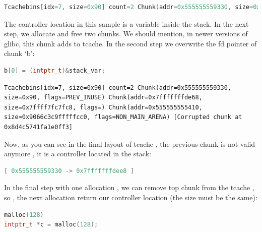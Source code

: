 \documentclass{masterthesis}
\newcommand*\libc{glibc}
\newcommand*\tch{tcache}
\begin{document}
\begin{lstlisting}[language=c,frame=tlrb]
Tcachebins[idx=7, size=0x90] count=2 Chunk(addr=0x555555559330, size=0x90, flags=PREV_INUSE) Chunk(addr=0x5555555592a0, size=0x90, flags=PREV_INUSE)
\end{lstlisting}

The controller location in this sample is a variable inside the stack. In the next step, we allocate and free two chunks. We should mention, in newer versions of \libc{}, this chunk adds to \tch{}.
In the second step we overwrite the fd pointer of chunk ‘b’:

\begin{lstlisting}[language=c,frame=tlrb]
b[0] = (intptr_t)&stack_var;
\end{lstlisting}

\begin{lstlisting}[frame=tlrb]
Tcachebins[idx=7, size=0x90] count=2 Chunk(addr=0x555555559330, size=0x90, flags=PREV_INUSE) Chunk(addr=0x7fffffffde68, size=0x7ffff7fc7fc8, flags=) Chunk(addr=0x555555555410, size=0x9066c3c9fffffcc0, flags=NON_MAIN_ARENA) [Corrupted chunk at 0x8d4c5741fa1e0ff3]
\end{lstlisting}

Now, as you can see in the final layout of \tch{} , the previous chunk is not valid anymore , it is a controller located in the stack:
\begin{lstlisting}[language=c,frame=tlrb]
[ 0x555555559330 -> 0x7fffffffdee8 ]
\end{lstlisting}
In the final step with one allocation , we can remove top chunk from the \tch{} , so , the next allocation return our controller location (the size must be the same):
\begin{lstlisting}[language=c,frame=tlrb]
malloc(128)
intptr_t *c = malloc(128);
\end{lstlisting}
\end{document}

